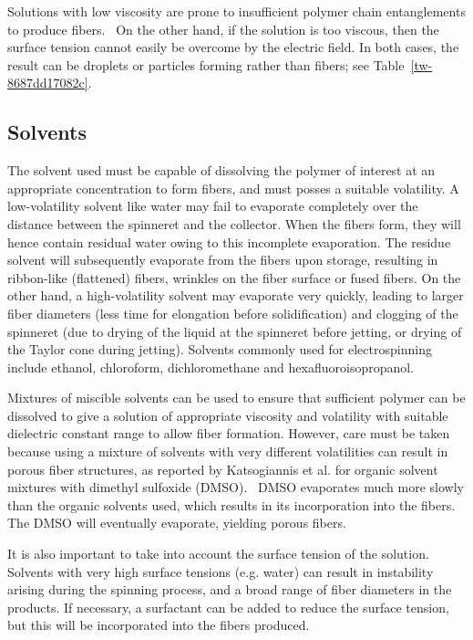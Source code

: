 \documentclass[5p,,preprint,12pt,twocolumn]{elsarticle}
\begin{document}
Solutions with low viscosity are prone to insufficient polymer chain entanglements to produce fibers.\unskip~\cite{527120:13082763} On the other hand, if the solution is too viscous, then the surface tension cannot easily be overcome by the electric field. In both cases, the result can be droplets or particles forming rather than fibers; see Table~\ref{tw-8687dd17082c}.



\subsection{Solvents}The solvent used must be capable of dissolving the polymer of interest at an appropriate concentration to form fibers, and must posses a suitable volatility. A low-volatility solvent like water may fail to evaporate completely over the distance between the spinneret and the collector. When the fibers form, they will hence contain residual water owing to this incomplete evaporation. The residue solvent will subsequently evaporate from the fibers upon storage, resulting in ribbon-like (flattened) fibers, wrinkles on the fiber surface or fused fibers. On the other hand, a high-volatility solvent may evaporate very quickly, leading to larger fiber diameters (less time for elongation before solidification) and clogging of the spinneret (due to drying of the liquid at the spinneret before jetting, or drying of the Taylor cone during jetting). Solvents commonly used for electrospinning include ethanol, chloroform, dichloromethane and hexafluoroisopropanol.

Mixtures of miscible solvents can be used to ensure that sufficient polymer can be dissolved to give a solution of appropriate viscosity and volatility with suitable dielectric constant range to allow fiber formation. However, care must be taken because using a mixture of solvents with very different volatilities can result in porous fiber structures, as reported by Katsogiannis et al. for organic solvent mixtures with dimethyl sulfoxide (DMSO).\unskip~\cite{527120:13082766} DMSO evaporates much more slowly than the organic solvents used, which results in its incorporation into the fibers. The DMSO will eventually evaporate, yielding porous fibers.

It is also important to take into account the surface tension of the solution. Solvents with very high surface tensions (e.g. water) can result in instability arising during the spinning process, and a broad range of fiber diameters in the products. If necessary, a surfactant can be added to reduce the surface tension, but this will be incorporated into the fibers produced.
    
\end{document}
